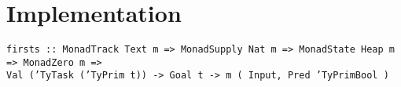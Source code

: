 
\section{Implementation}
\label{sec:implementation}
\lstset{language=Haskell}
\footnotesize\noindent%
\texttt{firsts :: MonadTrack Text m => MonadSupply Nat m => MonadState Heap m => MonadZero m =>}\\
\texttt{Val ('TyTask ('TyPrim t)) -> Goal t -> m ( Input, Pred 'TyPrimBool )}\\
\normalsize

